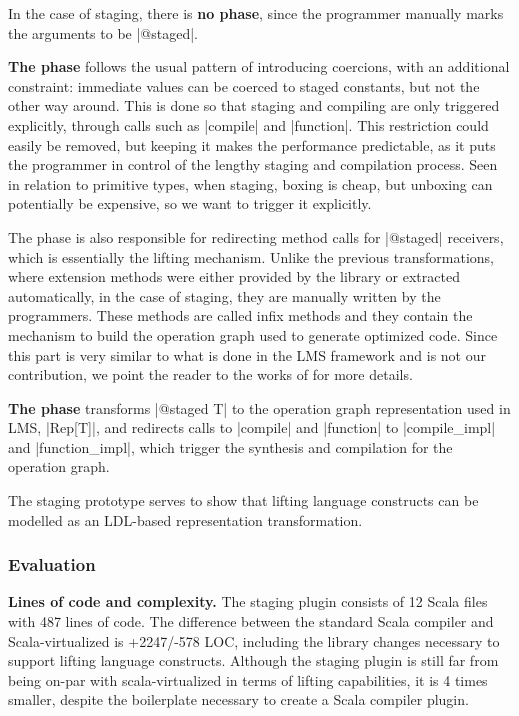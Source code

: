 In the case of staging, there is \textbf{no \inject{} phase}, since the programmer manually marks the arguments to be |@staged|.

\textbf{The \coerce{} phase} follows the usual pattern of introducing coercions, with an additional constraint: immediate values can be coerced to staged constants, but not the other way around. This is done so that staging and compiling are only triggered explicitly, through calls such as |compile| and |function|. This restriction could easily be removed, but keeping it makes the performance predictable, as it puts the programmer in control of the lengthy staging and compilation process. Seen in relation to primitive types, when staging, boxing is cheap, but unboxing can potentially be expensive, so we want to trigger it explicitly.

The \coerce{} phase is also responsible for redirecting method calls for |@staged| receivers, which is essentially the lifting mechanism. Unlike the previous transformations, where extension methods were either provided by the library or extracted automatically, in the case of staging, they are manually written by the programmers. These methods are called infix methods \cite{scala-virtualized} and they contain the mechanism to build the operation graph used to generate optimized code. Since this part is very similar to what is done in the LMS framework and is not our contribution, we point the reader to the works of  \cite{tiark-lms, tiark-building-blocks, tiark-thesis} for more details.

\textbf{The \commit{} phase} transforms |@staged T| to the operation graph representation used in LMS, |Rep[T]|, and redirects calls to |compile| and |function| to |compile_impl| and |function_impl|, which trigger the synthesis and compilation for the operation graph.

The staging prototype serves to show that lifting language constructs can be modelled as an LDL-based representation transformation.

\subsubsection*{Evaluation}

\textbf{Lines of code and complexity.} The staging plugin consists of 12 Scala files with 487 lines of code. The difference between the standard Scala compiler and Scala-virtualized is +2247/-578 LOC, including the library changes necessary to support lifting language constructs. Although the staging plugin is still far from being on-par with scala-virtualized in terms of lifting capabilities, it is 4 times smaller, despite the boilerplate necessary to create a Scala compiler plugin.

